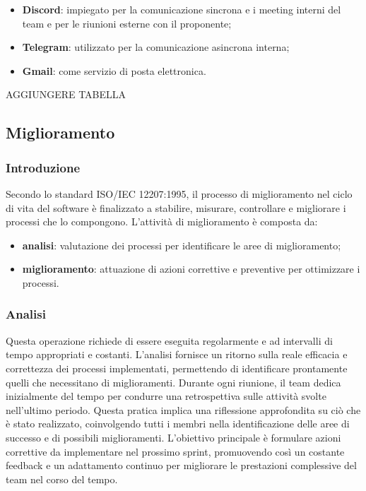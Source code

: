 \begin{itemize}
    \item \textbf{Discord}: impiegato per la comunicazione sincrona e i meeting interni del team e per le riunioni esterne con il proponente;
    \item \textbf{Telegram}: utilizzato per la comunicazione asincrona interna;
    \item \textbf{Gmail}: come servizio di posta elettronica.
\end{itemize}

AGGIUNGERE TABELLA

\subsection{Miglioramento}
\subsubsection{Introduzione}
Secondo lo standard ISO/IEC 12207:1995, il processo di miglioramento nel ciclo di vita del software è finalizzato a stabilire, misurare, controllare e migliorare i processi che lo compongono. L’attività di miglioramento è composta da:
\begin{itemize}
    \item \textbf{analisi}: valutazione dei processi per identificare le aree di miglioramento;
    \item \textbf{miglioramento}: attuazione di azioni correttive e preventive per ottimizzare i processi.
\end{itemize}
\subsubsection{Analisi}
Questa operazione richiede di essere eseguita regolarmente e ad intervalli di tempo appropriati e costanti. L’analisi fornisce un ritorno sulla reale efficacia e correttezza dei processi implementati, permettendo di identificare prontamente quelli che necessitano di miglioramenti.
Durante ogni riunione, il team dedica inizialmente del tempo per condurre una retrospettiva sulle attività svolte nell’ultimo periodo. Questa pratica implica una riflessione approfondita su ciò che è stato realizzato, coinvolgendo tutti i membri nella identificazione delle aree di successo e di possibili miglioramenti.
L’obiettivo principale è formulare azioni correttive da implementare nel prossimo sprint, promuovendo così un costante feedback e un adattamento continuo per migliorare le prestazioni complessive del team nel corso del tempo.
